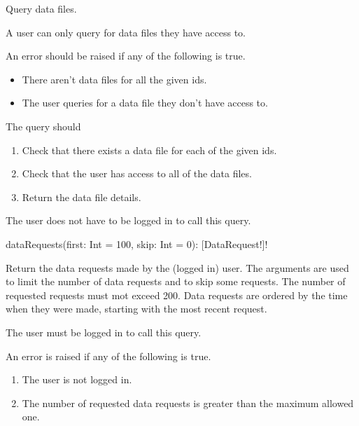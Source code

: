 Query data files.

\restrictions

A user can only query for data files they have access to.

\errors

An error should be raised if any of the following is true.

\begin{itemize}
    \item There aren't data files for all the given ids.
    \item The user queries for a data file they don't have access to.
\end{itemize}

\functionality

The query should

\begin{enumerate}
    \item Check that there exists a data file for each of the given ids.
    \item Check that the user has access to all of the data files.
    \item Return the data file details.
\end{enumerate}

\begin{note}
The user does not have to be logged in to call this query.
\end{note}


\begin{code}
dataRequests(first: Int = 100, skip: Int = 0): [DataRequest!]!
\end{code}

Return the data requests made by the (logged in) user. The arguments are used to limit the number of data requests and to skip some requests. The number of requested requests must mot exceed 200. Data requests are ordered by the time when they were made, starting with the most recent request.

\restrictions

The user must be logged in to call this query.

\errors

An error is raised if any of the following is true.

\begin{enumerate}
    \item The user is not logged in.
    \item The number of requested data requests is greater than the maximum allowed one.
\end{enumerate}

